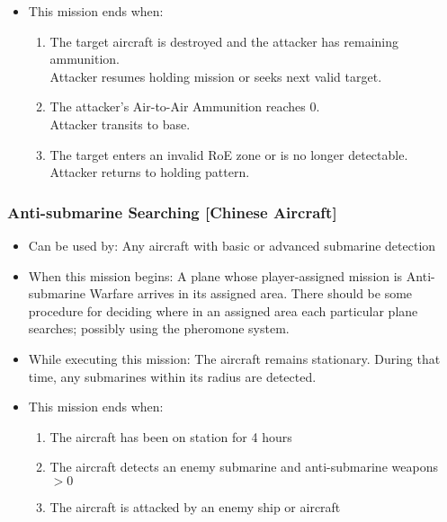 \documentclass{article}
\begin{document}
\begin{itemize}
                \item This mission ends when:
                \begin{enumerate}[label=\arabic*)]
                    \item The target aircraft is destroyed and the attacker has remaining ammunition. \\
                          Attacker resumes holding mission or seeks next valid target.
                    \item The attacker’s Air-to-Air Ammunition reaches 0. \\
                          Attacker transits to base.
                    \item The target enters an invalid RoE zone or is no longer detectable. \\
                          Attacker returns to holding pattern.
                \end{enumerate}
            \end{itemize}

            
        \subsubsection{Anti-submarine Searching [Chinese Aircraft]}
            \begin{itemize}
                \item Can be used by: Any aircraft with basic or advanced submarine detection
                \item When this mission begins: A plane whose player-assigned mission is Anti-submarine Warfare arrives in its assigned area. There should be some procedure for deciding where in an assigned area each particular plane searches; possibly using the pheromone system.
                \item While executing this mission: The aircraft remains stationary. During that time, any submarines within its radius are detected.
                \item This mission ends when:
                \begin{enumerate}[label=\arabic*)]
                    \item The aircraft has been on station for 4 hours \par
                    [Aircraft mission becomes Transit to Base]
                    \item The aircraft detects an enemy submarine and anti-submarine weapons $>0$\par
                    [Aircraft mission becomes Attacking Submarine]
                    \item The aircraft is attacked by an enemy ship or aircraft \par
                    [Aircraft mission becomes Transit to Base]
                \end{enumerate}
            \end{itemize}
\end{document}
